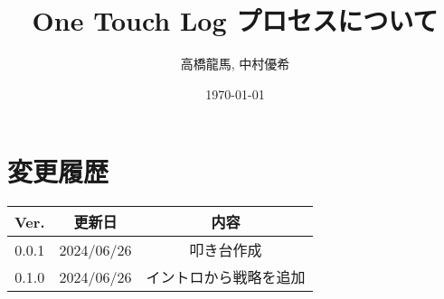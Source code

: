 \documentclass[a4paper,10pt,titlepage]{jreport}
\begin{document}
\title{One Touch Log プロセスについて}
\author{高橋龍馬, 中村優希}
\date{\today}
\maketitle

\section*{変更履歴}

\begin{longtable}[c]{|c|c|c|}
    \hline
        Ver. & 更新日 & 内容 \\
    \hline
    \endfirsthead
    \hline
        0.0.1 & 2024/06/26 & 叩き台作成 \\
    \hline
        0.1.0 & 2024/06/26 & イントロから戦略を追加 \\
    \hline
\end{longtable}

\newpage

\tableofcontents
\clearpage




\end{document}
